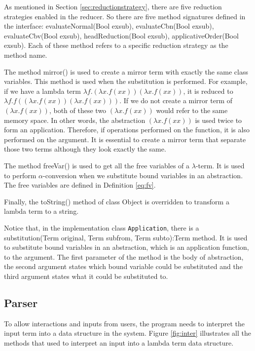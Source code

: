 As mentioned in Section \ref{sec:reductionstrategy}, there are five reduction strategies enabled in the reducer. So there are five method signatures defined in the interface: \textsf{evaluateNormal(Bool exsub), evaluateCbn(Bool exsub), evaluateCbv(Bool exsub), headReduction(Bool exsub), applicativeOrder(Bool exsub)}. Each of these method refers to a specific reduction strategy as the method name. 

The method \textsf{mirror()} is used to create a mirror term with exactly the same class variables. This method is used when the substitution is performed. For example, if we have a lambda term $\lambda f.(\lambda x.f(xx))(\lambda x.f(xx))$, it is reduced to $\lambda f.f((\lambda x.f(xx))(\lambda x.f(xx)))$. If we do not create a mirror term of $(\lambda x.f(xx))$, both of these two $(\lambda x.f(xx))$ would refer to the same memory space. In other words, the abstraction $(\lambda x.f(xx))$ is used twice to form an application. Therefore, if operations performed on the function, it is also performed on the argument. It is essential to create a mirror term that separate those two terms although they look exactly the same.

The method \textsf{freeVar()} is used to get all the free variables of a $\lambda$-term. It is used to perform $\alpha$-conversion when we substitute bound variables in an abstraction. The free variables are defined in Definition \ref{eq:fv}.       

Finally, the \textsf{toString()} method of class \textsf{Object} is overridden to transform a lambda term to a string. 

Notice that, in the implementation class \verb|Application|, there is a \textsf{substitution(Term original, Term subfrom, Term subto):Term} method. It is used to substitute bound variables in an abstraction, which is an application function, to the argument. The first parameter of the method is the body of abstraction, the second argument states which bound variable could be substituted and the third argument states what it could be substituted to.

\subsection{Parser}
To allow interactions and inputs from users, the program needs to interpret the input term into a data structure in the system. Figure \ref{fig:inter} illustrates all the methods that used to interpret an input into a lambda term data structure.   

